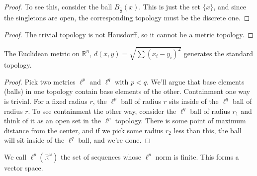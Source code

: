 
\begin{proof}
	
To see this, consider the ball $B_{\frac{1}{2}}(x)$.  This is just the set $\{x\}$, and since the singletons are open, the corresponding topology must be the discrete one.
\end{proof}


\begin{proof}
	The trivial topology is not Hausdorff, so it cannot be a metric topology.
\end{proof}


The Euclidean metric on $\mathbb{R}^n$, $d(x,y)=\sqrt{\sum(x_i-y_i)^2}$ generates the standard topology.




\begin{proof}
	Pick two metrics $\ell^p$ and $\ell^q$ with $p<q$.  We'll argue that base elements (balls) in one topology contain base elements of the other.  Containment one way is trivial.  For a fixed radius $r$, the $\ell^p$ ball of radius $r$ sits inside of the $\ell^q$ ball of radius $r$.  To see containment the other way, consider the $\ell^q$ ball of radius $r_1$ and think of it as an open set in the $\ell^p$ topology.  There is some point of maximum distance from the center, and if we pick some radius $r_2$ less than this, the ball will sit inside of the $\ell^q$ ball, and we're done.
\end{proof}


We call $\ell^p(\mathbb{R}^\omega)$ the set of sequences whose $\ell^p$ norm is finite.  This forms a vector space.